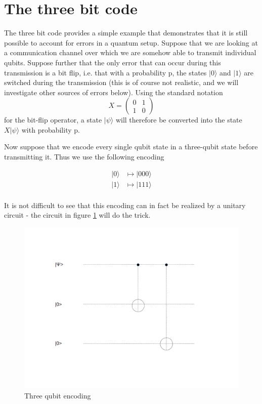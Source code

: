 \documentclass[a4paper, draft]{article}
\theoremstyle{own}
\theoremstyle{remark}
\begin{document}
\section{The three bit code}

The three bit code provides a simple example that demonstrates that it is still possible to account for errors in a quantum setup. Suppose that we are looking at a communication channel over which we are somehow able to transmit individual qubits. Suppose further that the only error that can occur during this transmission is a bit flip, i.e. that with a probability p, the states $|0 \rangle$ and $|1 \rangle$ are switched during the transmission (this is of course not realistic, and we will investigate other sources of errors below). Using the standard notation
$$
X = \begin{pmatrix} 0 & 1 \\ 1 & 0\end{pmatrix}
$$
for the bit-flip operator, a state $| \psi \rangle$ will therefore be converted into the state $X |\psi \rangle$ with probability p. 

Now suppose that we encode every single qubit state in a three-qubit state before transmitting it. Thus we use the following encoding

\begin{align*}
|0 \rangle & \mapsto |000 \rangle \\
|1 \rangle & \mapsto |111 \rangle \\
\end{align*}

It is not difficult to see that this encoding can in fact be realized by a unitary circuit - the circuit in figure \ref{fig:ThreeBitCode} will do the trick.

\begin{figure}[ht]
\centering
\includegraphics[width=1.0\linewidth]{images/ThreeBitCode}
\caption[Three qubit encoding]{Three qubit encoding}
\label{fig:ThreeBitCode}
\end{figure}
\end{document}
